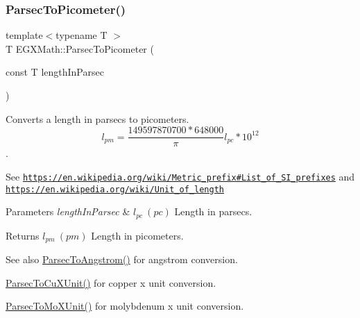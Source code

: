 \subsubsection{\texorpdfstring{Parsec\+To\+Picometer()}{ParsecToPicometer()}}
{\footnotesize\ttfamily template$<$typename T $>$ \\
T E\+G\+X\+Math\+::\+Parsec\+To\+Picometer (\begin{DoxyParamCaption}\item[{const T}]{length\+In\+Parsec }\end{DoxyParamCaption})}



Converts a length in parsecs to picometers. \[ l_{pm}=\frac{149597870700 * 648000}{\pi}l_{pc} * 10^{12} \]. 

See \href{https://en.wikipedia.org/wiki/Metric_prefix#List_of_SI_prefixes}{\tt https\+://en.\+wikipedia.\+org/wiki/\+Metric\+\_\+prefix\#\+List\+\_\+of\+\_\+\+S\+I\+\_\+prefixes} and \href{https://en.wikipedia.org/wiki/Unit_of_length}{\tt https\+://en.\+wikipedia.\+org/wiki/\+Unit\+\_\+of\+\_\+length} 
\begin{DoxyParams}{Parameters}
{\em length\+In\+Parsec} & $ l_{pc}\ (pc)$ Length in parsecs. \\
\hline
\end{DoxyParams}
\begin{DoxyReturn}{Returns}
$ l_{pm}\ (pm)$ Length in picometers. 
\end{DoxyReturn}
\begin{DoxySeeAlso}{See also}
\mbox{\hyperlink{group___e_g_x_math-_conversions-_length_conversions-_astronomical-_parsec-_non-_s_i_gae9721658cb4d8b9e1cfd85f20d646702}{Parsec\+To\+Angstrom()}} for angstrom conversion. 

\mbox{\hyperlink{group___e_g_x_math-_conversions-_length_conversions-_astronomical-_parsec-_non-_s_i_gad21a910de08e37197d58edf64c377222}{Parsec\+To\+Cu\+X\+Unit()}} for copper x unit conversion. 

\mbox{\hyperlink{group___e_g_x_math-_conversions-_length_conversions-_astronomical-_parsec-_non-_s_i_gaf076c4eb125bbc9fbabc040300961b6d}{Parsec\+To\+Mo\+X\+Unit()}} for molybdenum x unit conversion. 
\end{DoxySeeAlso}
\mbox{\label{group___e_g_x_math-_conversions-_length_conversions-_astronomical-_parsec-_s_i_gafa04d007102c3b440653c9c0460b0cd8}} 
